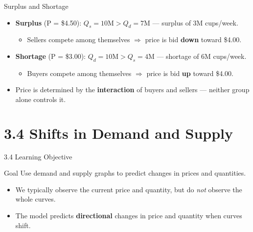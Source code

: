 \documentclass[aspectratio=169]{beamer}
\begin{document}
\begin{frame}{Surplus and Shortage}
\transfade
\begin{itemize}
  \item \textbf{Surplus} (P = \$4.50): $Q_s = 10\text{M} > Q_d = 7\text{M}$ --- surplus of 3M cups/week.
  \begin{itemize}
    \item Sellers compete among themselves $\Rightarrow$ price is bid \textbf{down} toward \$4.00.
  \end{itemize}
  \item \textbf{Shortage} (P = \$3.00): $Q_d = 10\text{M} > Q_s = 4\text{M}$ --- shortage of 6M cups/week.
  \begin{itemize}
    \item Buyers compete among themselves $\Rightarrow$ price is bid \textbf{up} toward \$4.00.
  \end{itemize}
  \item Price is determined by the \textbf{interaction} of buyers and sellers --- neither group alone controls it.
\end{itemize}
\end{frame}

\section{3.4 Shifts in Demand and Supply}

\begin{frame}{3.4 Learning Objective}
\transfade
\begin{block}{Goal}
Use demand and supply graphs to predict changes in prices and quantities.
\end{block}
\begin{itemize}
  \item We typically observe the current price and quantity, but do \emph{not} observe the whole curves.
  \item The model predicts \textbf{directional} changes in price and quantity when curves shift.
\end{itemize}
\end{frame}
\end{document}
